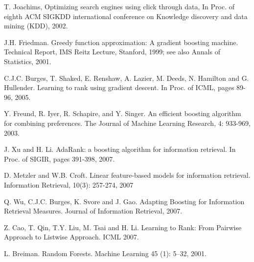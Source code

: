 \documentclass[]{article}
\begin{document}
\begin{thebibliography}{1}
T. Joachims, Optimizing search engines using click through data, In Proc.
of eighth ACM SIGKDD international conference on Knowledge discovery and data mining (KDD), 2002.

J.H. Friedman. Greedy function approximation: A gradient boosting machine. Technical Report, IMS Reitz Lecture, Stanford, 1999; see also Annals of Statistics, 2001.

C.J.C. Burges, T. Shaked, E. Renshaw, A. Lazier, M. Deeds, N. Hamilton and G. Hullender. Learning to rank using gradient descent. In Proc. of ICML, pages 89-96, 2005.

Y. Freund, R. Iyer, R. Schapire, and Y. Singer. An efficient boosting algorithm for combining preferences. The Journal of Machine Learning Research, 4: 933-969, 2003.

J. Xu and H. Li. AdaRank: a boosting algorithm for information retrieval. In Proc. of SIGIR, pages 391-398, 2007.

D. Metzler and W.B. Croft. Linear feature-based models for information retrieval. Information Retrieval, 10(3): 257-274, 2007

Q. Wu, C.J.C. Burges, K. Svore and J. Gao. Adapting Boosting for Information Retrieval Measures. Journal of Information Retrieval, 2007.

Z. Cao, T. Qin, T.Y. Liu, M. Tsai and H. Li. Learning to Rank: From Pairwise Approach to Listwise Approach. ICML 2007.

L. Breiman. Random Forests. Machine Learning 45 (1): 5–32, 2001.
 
\end{thebibliography}
\end{document}
